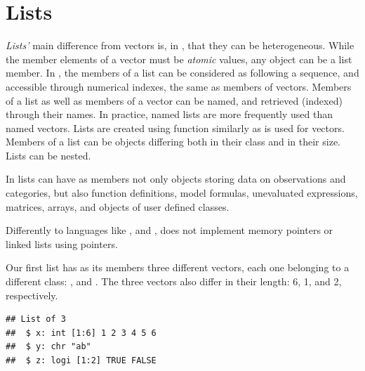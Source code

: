 \documentclass[krantz2]{krantz}\usepackage{knitr}
\begin{document}

\section{Lists}\label{sec:calc:lists}
\emph{Lists'} main difference from vectors is, in \Rlang, that they can be heterogeneous. While the member elements of a vector must be \emph{atomic} values, any \Rlang object can be a list member. In \Rlang, the members of a list can be considered as following a sequence, and accessible through numerical indexes, the same as members of vectors. Members of a list as well as members of a vector can be named, and retrieved (indexed) through their names. In practice, named lists are more frequently used than named vectors. Lists are created using function  similarly as  is used for vectors. Members of a list can be objects differing both in their class and in their size. Lists can be nested.

\begin{explainbox}
  In \Rlang lists can have as members not only objects storing data on observations and categories, but also function definitions, model formulas, unevaluated expressions, matrices, arrays, and objects of user defined classes.
  
  Differently to languages like \Clang, \Cpplang and \pascallang, \Rlang does not implement memory pointers or linked lists using pointers.
\end{explainbox}

Our first list has as its members three different vectors, each one belonging to a different class: ,  and . The three vectors also differ in their length: 6, 1, and 2, respectively.

\begin{knitrout}\footnotesize
{}\color{fgcolor}\begin{kframe}
\begin{alltt}
 \hlkwb{<-} \hlstd{(} \hlstd{=} \hlopt{:}\hlstd{,}  \hlstd{=} \hlstd{,}  \hlstd{=} \hlstd{(}\hlstd{,} \hlstd{))}
\end{alltt}
\end{kframe}
\end{knitrout}

\begin{knitrout}\footnotesize
{}\color{fgcolor}\begin{kframe}
\begin{alltt}
\end{alltt}
\begin{verbatim}
## List of 3
##  $ x: int [1:6] 1 2 3 4 5 6
##  $ y: chr "ab"
##  $ z: logi [1:2] TRUE FALSE
\end{verbatim}
\end{kframe}
\end{knitrout}
\end{document}
